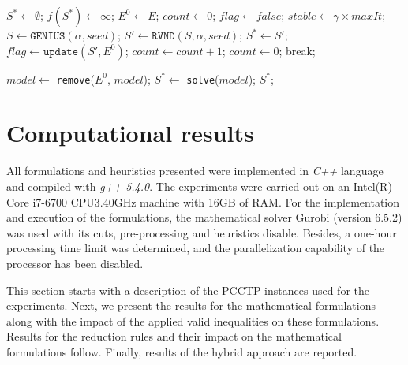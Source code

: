 \documentclass{singlecol-new}
\theoremstyle{TH}{
\newtheorem{lemma}{Lemma}
\newtheorem{theorem}[lemma]{Theorem}
\newtheorem{corrolary}[lemma]{Corrolary}
\newtheorem{conjecture}[lemma]{Conjecture}
\newtheorem{proposition}[lemma]{Proposition}
\newtheorem{claim}[lemma]{Claim}
\newtheorem{stheorem}[lemma]{Wrong Theorem}
}
\theoremstyle{THrm}{
\newtheorem{definition}{Definition}[section]
\newtheorem{question}{Question}[section]
\newtheorem{remark}{Remark}
\newtheorem{scheme}{Scheme}
}
\theoremstyle{THhit}{
\newtheorem{case}{Case}[section]
}
\begin{document}
\begin{algorithm}[!h]
	\caption{\hspace{-1mm}: \textbf{MPO\_S}($maxIt,\alpha, seed, \gamma, model$)}
	\label{alg:mpo}
		{\footnotesize
	\begin{algorithmic}[1]		
		\STATE $S^*\gets \emptyset$; $f(S^*) \gets \infty$; $E^0 \gets E$; $count \gets 0$; $flag \gets false$; 
		\STATE $stable \gets \gamma \times maxIt$; 
		\STATE $S \gets \texttt{GENIUS} (\alpha, seed)$;  
		\STATE $S' \gets \texttt{RVND} (S,\alpha, seed)$; 
		\STATE $S^* \gets S'$;
		\ENDIF
		\STATE $flag \gets \texttt{update}(S',E^0)$;
		\STATE $count \gets count + 1$;
		\ELSE
		\STATE $count \gets 0$;
		\ENDIF
		\STATE break; 
		\ENDIF
		\ENDFOR
		
		\STATE $model \gets $ \texttt{remove}($E^0$, $model$);
		\STATE $S^* \gets $ \texttt{solve}($model$);
		\RETURN $S^*$;
	\end{algorithmic}
}
\end{algorithm}


\section{Computational results}
\label{sec:results}


All formulations and heuristics presented were implemented in \textit{C++} language and compiled with \textit{g++ 5.4.0}. The experiments were carried out on an Intel(R) Core i7-6700 CPU\@ 3.40GHz machine with 16GB of RAM. For the implementation and execution of the formulations, the mathematical solver Gurobi (version 6.5.2) was used with its cuts, pre-processing and heuristics disable. Besides, a one-hour processing time limit was determined, and the parallelization capability of the processor has been disabled. 

This section starts with a description of the PCCTP
instances used for the experiments. Next, we present the results for the mathematical formulations along with the impact of the applied valid inequalities on these formulations. Results for the reduction rules and their impact on the mathematical formulations follow. Finally, results of the hybrid approach are reported.
\end{document}
